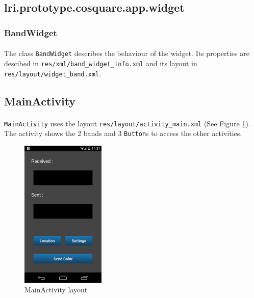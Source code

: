 \documentclass[12pt]{article}
\begin{document}
\subsection{lri.prototype.cosquare.app.widget}
\subsubsection{BandWidget}
\paragraph{} The class \verb?BandWidget? describes the behaviour of the widget. Its properties are descibed in \verb?res/xml/band_widget_info.xml? and its layout in \verb?res/layout/widget_band.xml?.


\subsection{MainActivity}
\paragraph{}\verb?MainActivity? uses the layout \verb?res/layout/activity_main.xml? (See Figure \ref{fig:main}). The activity shows the 2 bands and 3 \verb?Button?s to access the other activities.


\begin{figure}[ht]
	\centering
		\includegraphics[width=4cm]{pictures/main.png}
	\caption{MainActivity layout}
	\label{fig:main}
\end{figure}
\end{document}
